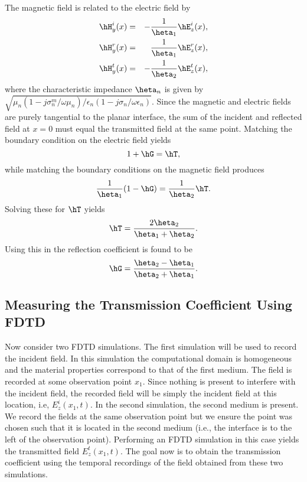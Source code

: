 The magnetic field is related to the electric field by
\begin{eqnarray}
  \hH_y^i(x) &=& -\frac{1}{\heta_1}\hE_z^i(x), \\ 
  \hH_y^r(x) &=& \frac{1}{\heta_1}\hE_z^r(x), \\ 
  \hH_y^t(x) &=& -\frac{1}{\heta_2}\hE_z^t(x),
\end{eqnarray}
where the characteristic impedance $\heta_n$ is given by
$\sqrt{\mu_n(1-j\sigma^m_n/\omega\mu_n)/
  \epsilon_n(1-j\sigma_n/\omega\epsilon_n)}$.  Since the magnetic and
electric fields are purely tangential to the planar interface, the sum
of the incident and reflected field at $x=0$ must equal the
transmitted field at the same point.  Matching the boundary condition
on the electric field yields
\begin{equation}
  1 + \hG = \hT,
  \label{eq:matchingFields}
\end{equation}
while matching the boundary conditions on the magnetic field produces
\begin{equation}
 \frac{1}{\heta_1}(1 - \hG) = \frac{1}{\heta_2}\hT.
\end{equation}
Solving these for $\hT$ yields
\begin{equation}
  \hT = \frac{2\heta_2}{\heta_1+\heta_2}.
  \label{eq:transCoefSpectral}
\end{equation}
Using this in  the reflection coefficient is
found to be
\begin{equation}
  \hG = \frac{\heta_2-\heta_1}{\heta_2+\heta_1}.
  \label{eq:refCoefSpectral}
\end{equation}

\subsection{Measuring the Transmission Coefficient Using FDTD
\label{sec:measureTrans}}

Now consider two FDTD simulations.  The first simulation will be used
to record the incident field.  In this simulation the computational
domain is homogeneous and the material properties correspond to that
of the first medium.  The field is recorded at some observation point
$x_1$.  Since nothing is present to interfere with the incident field,
the recorded field will be simply the incident field at this location,
i.e, $E_z^i(x_1,t)$.  In the second simulation, the second medium is
present.  We record the fields at the same observation point but we
ensure the point was chosen such that it is located in the second
medium (i.e., the interface is to the left of the observation point).
Performing an FDTD simulation in this case yields the transmitted
field $E_z^t(x_1,t)$.  The goal now is to obtain the transmission
coefficient using the temporal recordings of the field obtained from
these two simulations.

